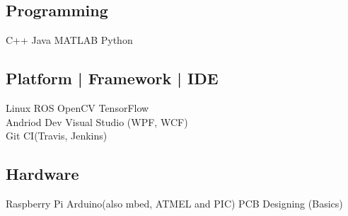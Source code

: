 \documentclass[]{resume-openfont}
\begin{document}
\begin{minipage}[t]{0.36\textwidth}
\subsection{Programming}
C++ \textbullet{}  Java \textbullet{} MATLAB \textbullet{} Python \\
\sectionsep
\subsection{Platform | Framework | IDE}
Linux \textbullet{} ROS \textbullet{} OpenCV \textbullet{} TensorFlow\\
Andriod Dev \textbullet{} Visual Studio (WPF, WCF) \\
Git \textbullet{} CI(Travis, Jenkins)
\sectionsep
\subsection{Hardware}
Raspberry Pi \textbullet{} Arduino(also mbed, ATMEL and PIC)  \textbullet{} PCB Designing (Basics)  


%
%

\end{minipage} 
\hfill
\end{document}
